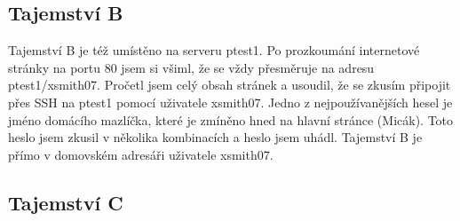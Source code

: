 \documentclass[11pt,a4paper]{article}
\begin{document}
\subsection{Tajemství B}
Tajemství B je též umístěno na serveru ptest1. Po prozkoumání internetové stránky na portu 80 jsem si všiml, že se vždy přesměruje na adresu ptest1/xsmith07. Pročetl jsem celý obsah stránek a usoudil, že se zkusím připojit přes SSH na ptest1 pomocí uživatele xsmith07. Jedno z nejpoužívanějších hesel je jméno domácího mazlíčka, které je zmíněno hned na hlavní stránce (Micák). Toto heslo jsem zkusil v několika kombinacích a heslo jsem uhádl. Tajemství B je přímo v domovském adresáři uživatele xsmith07.

\subsection{Tajemství C}
\end{document}
